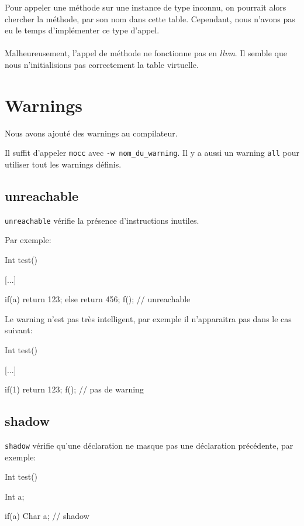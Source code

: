\documentclass{scrartcl}
\newcommand{\mocc}{\texttt{mocc}}
\newcommand{\llvm}{\textit{llvm}}
\begin{document}
      Pour appeler une méthode sur une instance de type inconnu, on pourrait
      alors chercher la méthode, par son nom dans cette table. Cependant, nous
      n'avons pas eu le temps d'implémenter ce type d'appel.

      \paragraph{}
      Malheureusement, l'appel de méthode ne fonctionne pas en \llvm{}. Il
      semble que nous n'initialisions pas correctement la table virtuelle.

\section{Warnings}\label{sec:warnings}
  Nous avons ajouté des warnings au compilateur.

  Il suffit d'appeler \mocc{} avec \verb+-w nom_du_warning+.
  Il y a aussi un warning \verb+all+ pour utiliser tout les warnings définis.

  \subsection{unreachable}
    \verb"unreachable" vérifie la présence d'instructions inutiles.

    Par exemple:
    \begin{moccode}
Int test() {
    [...]

    if(a) {
        return 123;
    }
    else {
        return 456;
    }
    f(); // unreachable
}
    \end{moccode}

    Le warning n'est pas très intelligent, par exemple il n'apparaitra pas dans
    le cas suivant:
    \begin{moccode}
Int test() {
    [...]

    if(1) {
        return 123;
    }
    f(); // pas de warning
}
    \end{moccode}

  \subsection{shadow}
    \verb"shadow" vérifie qu'une déclaration ne masque pas une déclaration
    précédente, par exemple:
    \begin{moccode}
Int test() {
    Int a;

    if(a) {
        Char a; // shadow
    }
}
    \end{moccode}
\end{document}
